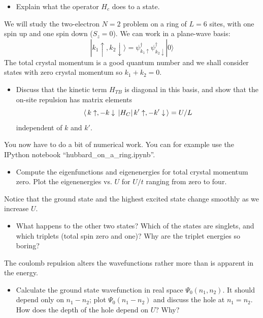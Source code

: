 \documentclass[a4paper,12pt]{article}
\begin{document}
\begin{description}
\begin{itemize}
\item Explain what the operator $H_c$ does to a state.
\end{itemize}

We will study the two-electron $N=2$ problem on a ring of 
$L = 6$ sites, with one spin up and one spin down ($S_z=0$).  We can work
in a plane-wave basis: 
\begin{equation}
  \label{eq:1}
|k_1 \uparrow, k_2 \downarrow \rangle =
\psi^\dagger_{k_1\uparrow}\psi^\dagger_{k_2\downarrow} |0\rangle
\end{equation}
The total crystal momentum is a good quantum number and we shall
consider states with zero crystal momentum so $k_1 + k_2 = 0$.

\begin{itemize}
\item  Discuss that the kinetic
term $H_{TB}$ is diagonal in this basis, and show that the on-site repulsion
has matrix elements 
$$\langle\,k\uparrow,-k\downarrow\,\vert H_C\vert\,k'\uparrow,-k'\downarrow\,\rangle = U/L$$
independent of $k$ and $k'.$
\end{itemize}
You now have to do a bit of numerical work. You can for example use
the IPython notebook ``hubbard\_on\_a\_ring.ipynb''.

\begin{itemize}
\item Compute the eigenfunctions and eigenenergies for total crystal momentum zero.
  Plot the eigenenergies vs. $U$ for $U/t$ ranging from zero to four.
\end{itemize}

Notice that the ground state and the highest excited state change
smoothly as we increase $U$.
\begin{itemize}
\item What happens to the other two states?  Which of the states are
  singlets, and which triplets (total spin zero and one)?  Why are the
  triplet energies so boring?
\end{itemize} The coulomb repulsion alters the wavefunctions
rather more than is apparent in the energy.
\begin{itemize}
\item Calculate the ground state wavefunction in real space
  $\Psi_0(n_1,n_2)$.  It should depend only on $n_1-n_2$; plot
  $\Psi_{0}(n_1-n_2)$ and discuss the hole at $n_1 = n_2.$ How does
  the depth of the hole depend on $U$? Why?
\end{itemize}
\end{description}
\end{document}
